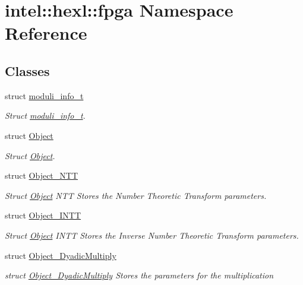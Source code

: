 \hypertarget{namespaceintel_1_1hexl_1_1fpga}{\section{intel\-:\-:hexl\-:\-:fpga Namespace Reference}
\label{namespaceintel_1_1hexl_1_1fpga}
}
\subsection*{Classes}
\begin{DoxyCompactItemize}
\item 
struct \hyperlink{structintel_1_1hexl_1_1fpga_1_1moduli__info__t}{moduli\-\_\-info\-\_\-t}
\begin{DoxyCompactList}\small\item\em Struct \hyperlink{structintel_1_1hexl_1_1fpga_1_1moduli__info__t}{moduli\-\_\-info\-\_\-t}. \end{DoxyCompactList}\item 
struct \hyperlink{structintel_1_1hexl_1_1fpga_1_1Object}{Object}
\begin{DoxyCompactList}\small\item\em Struct \hyperlink{structintel_1_1hexl_1_1fpga_1_1Object}{Object}. \end{DoxyCompactList}\item 
struct \hyperlink{structintel_1_1hexl_1_1fpga_1_1Object__NTT}{Object\-\_\-\-N\-T\-T}
\begin{DoxyCompactList}\small\item\em Struct \hyperlink{structintel_1_1hexl_1_1fpga_1_1Object}{Object} N\-T\-T Stores the Number Theoretic Transform parameters. \end{DoxyCompactList}\item 
struct \hyperlink{structintel_1_1hexl_1_1fpga_1_1Object__INTT}{Object\-\_\-\-I\-N\-T\-T}
\begin{DoxyCompactList}\small\item\em Struct \hyperlink{structintel_1_1hexl_1_1fpga_1_1Object}{Object} I\-N\-T\-T Stores the Inverse Number Theoretic Transform parameters. \end{DoxyCompactList}\item 
struct \hyperlink{structintel_1_1hexl_1_1fpga_1_1Object__DyadicMultiply}{Object\-\_\-\-Dyadic\-Multiply}
\begin{DoxyCompactList}\small\item\em struct \hyperlink{structintel_1_1hexl_1_1fpga_1_1Object__DyadicMultiply}{Object\-\_\-\-Dyadic\-Multiply} Stores the parameters for the multiplication \end{DoxyCompactList}\item 

\end{DoxyCompactItemize}
